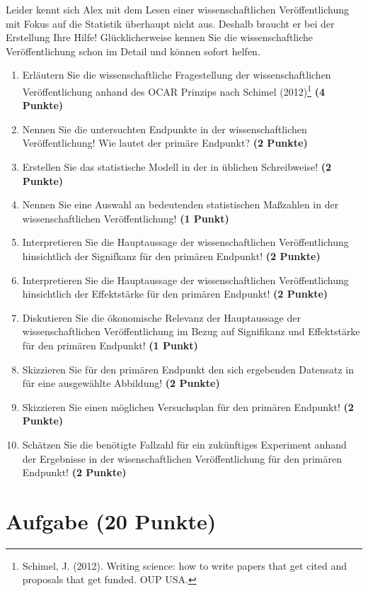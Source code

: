 \documentclass[a4paper, 9pt]{scrartcl}\usepackage[]{graphicx}\usepackage[]{xcolor}
\begin{document}
Leider kennt sich Alex mit dem Lesen einer wissenschaftlichen Veröffentlichung mit Fokus auf die Statistik überhaupt nicht aus. Deshalb braucht er bei der Erstellung Ihre Hilfe! Glücklicherweise kennen Sie die wissenschaftliche Veröffentlichung schon im Detail und können sofort helfen.

\begin{enumerate}
  \setcounter{enumi}{0}
  \item Erläutern Sie die wissenschaftliche Fragestellung der wissenschaftlichen Veröffentlichung anhand des OCAR Prinzips nach Schimel (2012)\footnote{Schimel, J. (2012). Writing science: how to write papers that get cited and proposals that get funded. OUP USA.} \textbf{(4 Punkte)}
  \item Nennen Sie die untersuchten Endpunkte in der wissenschaftlichen Veröffentlichung! Wie lautet der primäre Endpunkt? \textbf{(2 Punkte)} 
\item Erstellen Sie das statistische Modell in der in \Rlogo üblichen Schreibweise! \textbf{(2 Punkte)}
  \item Nennen Sie eine Auswahl an bedeutenden statistischen Maßzahlen in der wissenschaftlichen Veröffentlichung! \textbf{(1 Punkt)}
  \item Interpretieren Sie die Hauptaussage der wissenschaftlichen Veröffentlichung hinsichtlich der Signifkanz für den primären Endpunkt! \textbf{(2 Punkte)}
  \item Interpretieren Sie die Hauptaussage der wissenschaftlichen Veröffentlichung hinsichtlich der Effektstärke für den primären Endpunkt! \textbf{(2 Punkte)}
  \item Diskutieren Sie die ökonomische Relevanz der Hauptaussage der wissenschaftlichen Veröffentlichung im Bezug auf Signifikanz und Effektstärke für den primären Endpunkt! \textbf{(1 Punkt)}
  \item Skizzieren Sie für den primären Endpunkt den sich ergebenden Datensatz in \Rlogo für eine ausgewählte Abbildung! \textbf{(2 Punkte)}
\item Skizzieren Sie einen möglichen Versuchsplan für den primären Endpunkt! \textbf{(2 Punkte)}
  \item Schätzen Sie die benötigte Fallzahl für ein zukünftiges Experiment anhand der Ergebnisse in der wisenschaftlichen Veröffentlichung für den primären Endpunkt! \textbf{(2 Punkte)}
\end{enumerate} 
\clearpage

\section{Aufgabe \hfill (20 Punkte)}
\end{document}
